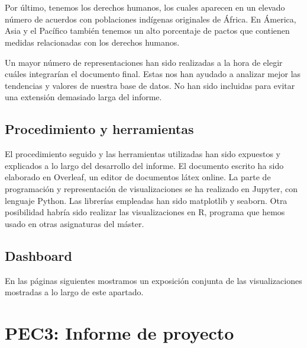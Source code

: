 \documentclass[11pt]{article}
\begin{document}
    \begin{center}
    \end{center}
    { \hspace*{\fill} \\}
    
    \begin{center}
    \end{center}
    { \hspace*{\fill} \\}
    
    Por último, tenemos los derechos humanos, los cuales aparecen en un elevado número de acuerdos con poblaciones indígenas originales de África. En Ámerica, Asia y el Pacífico también tenemos un alto porcentaje de pactos que contienen medidas relacionadas con los derechos humanos.
    
    Un mayor número de representaciones han sido realizadas a la hora de elegir cuáles integrarían el documento final. Estas nos han ayudado a analizar mejor las tendencias y valores de nuestra base de datos. No han sido incluidas para evitar una extensión demasiado larga del informe.
    
 \subsection{Procedimiento y
herramientas}

    El procedimiento seguido y las herramientas utilizadas han sido expuestos y explicados a lo largo del desarrollo del informe. El documento escrito ha sido elaborado en Overleaf, un editor de documentos látex online. La parte de programación y representación de visualizaciones se ha realizado en Jupyter, con lenguaje Python. Las librerías empleadas han sido matplotlib y seaborn. Otra posibilidad habría sido realizar las visualizaciones en R, programa que hemos usado en otras asignaturas del máster.

\subsection{Dashboard}

En las páginas siguientes mostramos un exposición conjunta de las visualizaciones mostradas a lo largo de este apartado. 

\pagebreak

\section{PEC3: Informe de proyecto}\label{PEC3}
\end{document}
